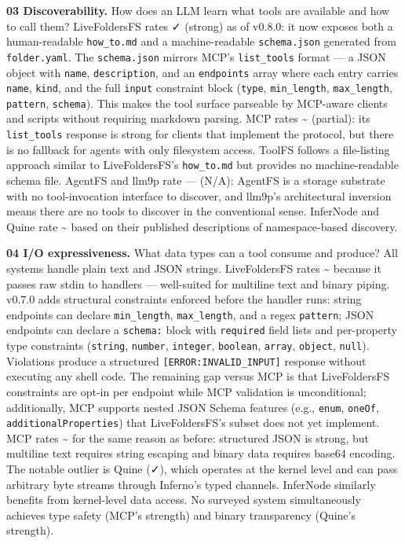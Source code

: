\documentclass[
  11pt,
]{article}
\begin{document}
\textbf{03 Discoverability.} How does an LLM learn what tools are
available and how to call them? LiveFoldersFS rates ✓ (strong) as of
v0.8.0: it now exposes both a human-readable \texttt{how\_to.md} and a
machine-readable \texttt{schema.json} generated from
\texttt{folder.yaml}. The \texttt{schema.json} mirrors MCP's
\texttt{list\_tools} format --- a JSON object with \texttt{name},
\texttt{description}, and an \texttt{endpoints} array where each entry
carries \texttt{name}, \texttt{kind}, and the full \texttt{input}
constraint block (\texttt{type}, \texttt{min\_length},
\texttt{max\_length}, \texttt{pattern}, \texttt{schema}). This makes the
tool surface parseable by MCP-aware clients and scripts without
requiring markdown parsing. MCP rates \textasciitilde{} (partial): its
\texttt{list\_tools} response is strong for clients that implement the
protocol, but there is no fallback for agents with only filesystem
access. ToolFS follows a file-listing approach similar to
LiveFoldersFS's \texttt{how\_to.md} but provides no machine-readable
schema file. AgentFS and llm9p rate --- (N/A): AgentFS is a storage
substrate with no tool-invocation interface to discover, and llm9p's
architectural inversion means there are no tools to discover in the
conventional sense. InferNode and Quine rate \textasciitilde{} based on
their published descriptions of namespace-based discovery.

\textbf{04 I/O expressiveness.} What data types can a tool consume and
produce? All systems handle plain text and JSON strings. LiveFoldersFS
rates \textasciitilde{} because it passes raw stdin to handlers ---
well-suited for multiline text and binary piping. v0.7.0 adds structural
constraints enforced before the handler runs: string endpoints can
declare \texttt{min\_length}, \texttt{max\_length}, and a regex
\texttt{pattern}; JSON endpoints can declare a \texttt{schema:} block
with \texttt{required} field lists and per-property type constraints
(\texttt{string}, \texttt{number}, \texttt{integer}, \texttt{boolean},
\texttt{array}, \texttt{object}, \texttt{null}). Violations produce a
structured \texttt{{[}ERROR:INVALID\_INPUT{]}} response without
executing any shell code. The remaining gap versus MCP is that
LiveFoldersFS constraints are opt-in per endpoint while MCP validation
is unconditional; additionally, MCP supports nested JSON Schema features
(e.g., \texttt{enum}, \texttt{oneOf}, \texttt{additionalProperties})
that LiveFoldersFS's subset does not yet implement. MCP rates
\textasciitilde{} for the same reason as before: structured JSON is
strong, but multiline text requires string escaping and binary data
requires base64 encoding. The notable outlier is Quine (✓), which
operates at the kernel level and can pass arbitrary byte streams through
Inferno's typed channels. InferNode similarly benefits from kernel-level
data access. No surveyed system simultaneously achieves type safety
(MCP's strength) and binary transparency (Quine's strength).
\end{document}
